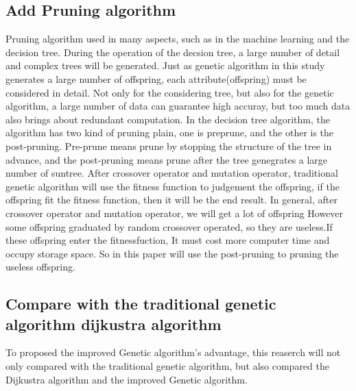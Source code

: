 \documentclass[12pt]{article}
\begin{document}
\subsection{Add Pruning algorithm}
Pruning algorithm used in many aspects, such as in the machine learning and the decision tree. During the operation of the decsion tree, a large number of detail and complex trees will be generated. Just as genetic algorithm in this study generates a large number of offspring, each attribute(offspring) must be considered in detail. Not only for the considering tree, but also for the genetic algorithm, a large number of data can guarantee high accuray, but too much data also brings about redundant computation.  In the decision tree algorithm, the algorithm has two kind of pruning plain, one is preprune, and the other is the post-pruning. Pre-prune means prune  by stopping the structure of the tree in advance, and the post-pruning means prune after the tree genegrates a large number of suntree. After crossover operator and mutation operator, traditional genetic algorithm will use the fitness function to judgement the offspring, if the offspring fit the fitness function, then it will be the end result. In general, after crossover operator and mutation operator, we will get a lot of offspring However some offspring graduated by random crossover operated, so they are useless.If these offspring enter the fitnessfuction, It must cost more computer time and occupy storage space. So in this paper will use the post-pruning to pruning the useless offspring. 
\subsection{Compare with the traditional genetic algorithm dijkustra algorithm }
To proposed the improved Genetic algorithm's advantage, this reaserch will not only compared with the traditional genetic algorithm, but also compared the Dijkustra algorithm and the improved Genetic algorithm.
\end{document}
